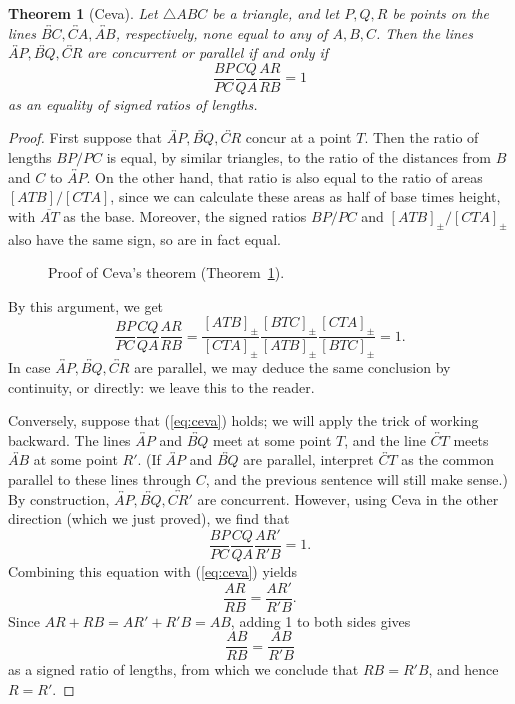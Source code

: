 \documentclass[12pt]{book}
\numberwithin{exc}{section}
\numberwithin{figure}{section}
\newtheorem{theorem}{Theorem}[section]
\numberwithin{equation}{theorem}
\def\line#1{\overleftrightarrow{#1}}
\def\seg#1{\overline{#1}}
\begin{document}
\begin{theorem}[Ceva] \label{thm:ceva}
Let $\triangle ABC$ be a triangle, and let 
$P, Q, R$ be points on the lines $\line{BC}, 
\line{CA}, \line{AB}$, respectively, none equal to any of
$A,B,C$. Then the lines 
$\line{AP}, \line{BQ}, \line{CR}$ are concurrent or
parallel if 
and only if 
\begin{equation} \label{eq:ceva}
\frac{BP}{PC} \frac{CQ}{QA} \frac{AR}{RB} = 1
\end{equation}
as an equality of signed ratios of lengths.
\end{theorem}
\begin{proof}
First suppose that  $\line{AP}, \line{BQ}, \line{CR}$ 
concur at a point $T$. Then 
the ratio of lengths $BP/PC$ is equal, by similar triangles, to the 
ratio of the distances from $B$ and $C$ to $\line{AP}$. On the other 
hand, that ratio is also equal to the ratio of areas $[ATB]/[CTA]$, since
we can calculate these areas as half of base times height, with $\seg{AT}$ 
as the base. Moreover, the signed ratios $BP/PC$ and 
$[ATB]_{\pm}/[CTA]_{\pm}$
also have the same sign, so are in fact equal.
\begin{figure}[ht]
\caption{Proof of Ceva's theorem (Theorem~\ref{thm:ceva}).}
\end{figure}

By this argument, we get
\[
\frac{BP}{PC} \frac{CQ}{QA} \frac{AR}{RB} = \frac{[ATB]_\pm}{[CTA]_\pm}
\frac{[BTC]_\pm}{[ATB]_\pm} \frac{[CTA]_\pm}{[BTC]_\pm} = 1.
\]
In case $\line{AP}, \line{BQ}, \line{CR}$ are parallel, we may deduce the
same conclusion by continuity, or directly: we leave this to the reader.

Conversely, suppose that (\ref{eq:ceva}) holds; we will apply the
trick of working backward. The lines $\line{AP}$ and 
$\line{BQ}$ meet at some point $T$, and the line $\line{CT}$ 
meets $\line{AB}$ at some point $R'$. (If $\line{AP}$ and $\line{BQ}$
are parallel, interpret $\line{CT}$ as the common parallel to these lines
through $C$, and the previous sentence will still make sense.)
By construction, $\line{AP}, \line{BQ}, \line{CR'}$ 
are concurrent. However, using Ceva in the other direction 
(which we just proved), we find that
\[
\frac{BP}{PC} \frac{CQ}{QA} \frac{AR'}{R'B} = 1.
\]
Combining this equation with (\ref{eq:ceva}) yields
\[
\frac{AR}{RB} = \frac{AR'}{R'B}.
\]
Since $AR + RB = AR' + R'B = AB$, adding 1 to both sides gives
\[
\frac{AB}{RB} = \frac{AB}{R'B}
\]
as a signed ratio of lengths,
from which we conclude that $RB = R'B$, and hence $R = R'$.
\end{proof}
\end{document}
